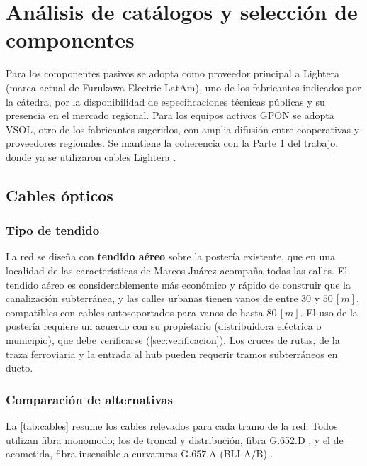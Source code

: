 \section{Análisis de catálogos y selección de componentes}
\label{sec:componentes}
Para los componentes pasivos se adopta como proveedor principal a Lightera (marca actual de Furukawa Electric LatAm), uno de los fabricantes indicados por la cátedra, por la disponibilidad de especificaciones técnicas públicas y su presencia en el mercado regional. Para los equipos activos GPON se adopta VSOL, otro de los fabricantes sugeridos, con amplia difusión entre cooperativas y proveedores regionales. Se mantiene la coherencia con la Parte 1 del trabajo, donde ya se utilizaron cables Lightera \cite{informe_p1}.

\subsection{Cables ópticos}
\label{sec:cables}

\subsubsection{Tipo de tendido}
La red se diseña con \textbf{tendido aéreo} sobre la postería existente, que en una localidad de las características de Marcos Juárez acompaña todas las calles. El tendido aéreo es considerablemente más económico y rápido de construir que la canalización subterránea, y las calles urbanas tienen vanos de entre $30$ y $50 \, [m]$, compatibles con cables autosoportados para vanos de hasta $80 \, [m]$. El uso de la postería requiere un acuerdo con su propietario (distribuidora eléctrica o municipio), que debe verificarse (\autoref{sec:verificacion}). Los cruces de rutas, de la traza ferroviaria y la entrada al hub pueden requerir tramos subterráneos en ducto.

\subsubsection{Comparación de alternativas}
La \autoref{tab:cables} resume los cables relevados para cada tramo de la red. Todos utilizan fibra monomodo; los de troncal y distribución, fibra G.652.D \cite{g652}, y el de acometida, fibra insensible a curvaturas G.657.A (BLI-A/B) \cite{g657}.

